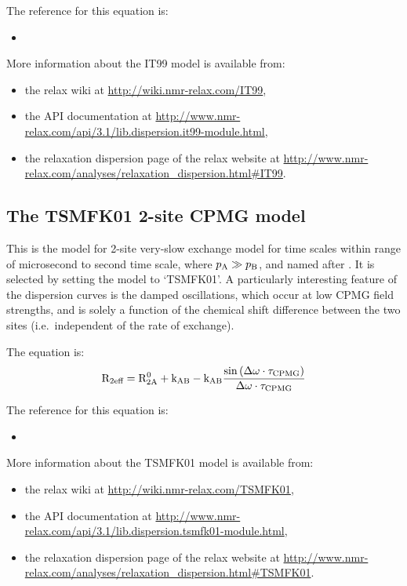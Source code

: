 The reference for this equation is:
\begin{itemize}
  \item {}
\end{itemize}

More information about the IT99 model is available from:
\begin{itemize}
  \item the relax wiki at \url{http://wiki.nmr-relax.com/IT99},
  \item the API documentation at \url{http://www.nmr-relax.com/api/3.1/lib.dispersion.it99-module.html},
  \item the relaxation dispersion page of the relax website at \url{http://www.nmr-relax.com/analyses/relaxation\_dispersion.html#IT99}.
\end{itemize}



\subsection{The TSMFK01 2-site CPMG model}
\label{sect: dispersion: TSMFK01 model}

This is the model for 2-site very-slow exchange model for time scales within range of microsecond to second time scale, where $p_\textrm{A} \gg p_\textrm{B}$, and named after \citet{Tollinger01}.
It is selected by setting the model to `TSMFK01'.
A particularly interesting feature of the dispersion curves is the damped oscillations, which occur at low CPMG field strengths, and is solely a function of the chemical shift difference between the two sites (i.e.\ independent of the rate of exchange).

The equation is:
\begin{equation}
    \mathrm{R}_\textrm{2eff} = \mathrm{R}_\mathrm{2A}^0 + \textrm{k}_\textrm{AB} - \textrm{k}_\textrm{AB} \frac{\sin{(\Delta\omega\cdot \tau_\textrm{CPMG})}}{\Delta\omega \cdot \tau_\textrm{CPMG}}
\end{equation}

The reference for this equation is:
\begin{itemize}
  \item {}
\end{itemize}

More information about the TSMFK01 model is available from:
\begin{itemize}
  \item the relax wiki at \url{http://wiki.nmr-relax.com/TSMFK01},
  \item the API documentation at \url{http://www.nmr-relax.com/api/3.1/lib.dispersion.tsmfk01-module.html},
  \item the relaxation dispersion page of the relax website at \url{http://www.nmr-relax.com/analyses/relaxation\_dispersion.html#TSMFK01}.
\end{itemize}


